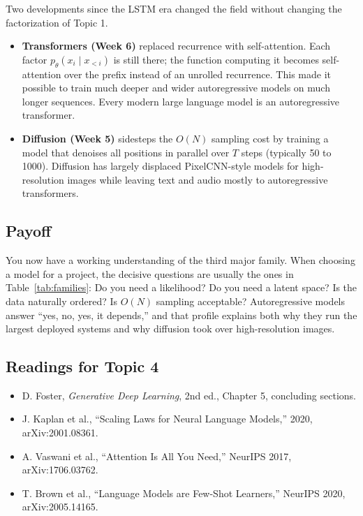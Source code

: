 \documentclass[11pt]{article}
\theoremstyle{remark}
\begin{document}
Two developments since the LSTM era changed the field without changing the factorization of Topic 1.
\begin{itemize}
\item \textbf{Transformers (Week 6)} replaced recurrence with self-attention. Each factor $p_\theta(x_i \mid x_{<i})$ is still there; the function computing it becomes self-attention over the prefix instead of an unrolled recurrence. This made it possible to train much deeper and wider autoregressive models on much longer sequences. Every modern large language model is an autoregressive transformer.
\item \textbf{Diffusion (Week 5)} sidesteps the $O(N)$ sampling cost by training a model that denoises all positions in parallel over $T$ steps (typically 50 to 1000). Diffusion has largely displaced PixelCNN-style models for high-resolution images while leaving text and audio mostly to autoregressive transformers.
\end{itemize}

\subsection{Payoff}

You now have a working understanding of the third major family. When choosing a model for a project, the decisive questions are usually the ones in Table~\ref{tab:families}: Do you need a likelihood? Do you need a latent space? Is the data naturally ordered? Is $O(N)$ sampling acceptable? Autoregressive models answer ``yes, no, yes, it depends,'' and that profile explains both why they run the largest deployed systems and why diffusion took over high-resolution images.

\subsection*{Readings for Topic 4}
\begin{itemize}[nosep]\raggedright
\item D. Foster, \emph{Generative Deep Learning}, 2nd ed., Chapter 5, concluding sections.
\item J. Kaplan et al., ``Scaling Laws for Neural Language Models,'' 2020, arXiv:2001.08361.
\item A. Vaswani et al., ``Attention Is All You Need,'' NeurIPS 2017, arXiv:1706.03762.
\item T. Brown et al., ``Language Models are Few-Shot Learners,'' NeurIPS 2020, arXiv:2005.14165.
\end{itemize}
\end{document}
